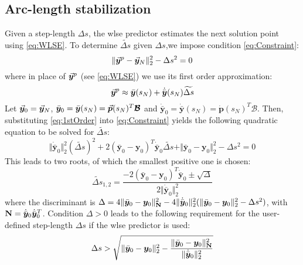 \subsection{Arc-length stabilization}\label{CH5-S2SS3}

Given a step-length $\Delta s$, the \acrshort{wlse} predictor estimates the 
next solution point using \ref{eq:WLSE}. To determine $\widetilde{\Delta s}$ 
given $\Delta s$,we impose condition
\ref{eq:Constraint}:
\begin{equation}
	\Vert \vec{\bm{y}}^p-\vec{\bm{y}}_N\Vert_2^2-\Delta s^2 = 0
	\label{eq:Constraint}
\end{equation}
where in place of $\vec{\bm{y}}^p$ (see \ref{eq:WLSE}) we use its first order 
approximation:
\begin{equation}
	\vec{\bm{y}}^p\approx 
	\bar{\bm{y}}(s_N)+\dot{\bar{\bm{y}}}(s_N)\widetilde{\Delta s}
	\label{eq:1stOrder}
\end{equation}
Let $\vec{\bm{y}}_0=\vec{\bm{y}}_N$, $\bar{\bm{y}}_0 = \bar{\bm{y}}(s_N) =
\vec{\bm{p}}(s_N)^T\bm{\mathcal{B}}$ and $\dot{\bar{\bm{y}}}_0 = 
\dot{\bar{\bm{y}}}(s_N) = \dot{\bm{p}}(s_N)^T\bm{\mathcal{B}}$. Then,
substituting \ref{eq:1stOrder} into \ref{eq:Constraint} yields the following
quadratic equation to be solved for $\widetilde{\Delta s}$:
\begin{equation}
	\Vert\dot{\bar{\bm{y}}}_0\Vert_2^2(\widetilde{\Delta s})^2+
	2(\bar{\bm{y}}_0-\bm{y}_0)^T\dot{\bar{\bm{y}}}_0 \widetilde{\Delta s}+
	\Vert \bar{\bm{y}}_0-\bm{y}_0\Vert_2^2-\Delta s^2=0
	\label{eq:QUADRATIC_STAB}
\end{equation}
This leads to two roots, of which the smallest positive one is chosen:
\begin{equation}
	\widetilde{\Delta s}_{1,2} =
	\dfrac{-2(\bar{\bm{y}}_0-\bm{y}_0)^T\dot{\bar{\bm{y}}}_0\pm\sqrt{\Delta}}
	{2\Vert\dot{\bar{\bm{y}}}_0\Vert_2^2}
	\label{eq:ROOTS}
\end{equation}
where the discriminant is $\Delta = 4\Vert
\bar{\bm{y}}_0-\bm{y}_0\Vert^2_{\mathbf{N}} -
4\Vert\dot{\bar{\bm{y}}}_0\Vert_2^2(\Vert
\bar{\bm{y}}_0-\bm{y}_0\Vert_2^2-\Delta s^2)$, with $\mathbf{N} = 
\dot{\bar{\bm{y}}}_0\dot{\bar{\bm{y}}}_0^T$. Condition $\Delta > 0$ leads to
the following requirement for the user-defined step-length $\Delta s$ if the
\acrshort{wlse} predictor is used:
\begin{equation}
	\Delta s > \sqrt{\Vert \bar{\bm{y}}_0-\bm{y}_0\Vert_2^2-
		\dfrac{\Vert 
		\bar{\bm{y}}_0-\bm{y}_0\Vert^2_{\mathbf{N}}}{\Vert\dot{\bar{\bm{y}}}_0
			\Vert_2^2}}
	\label{eq:DSREQ}
\end{equation}

